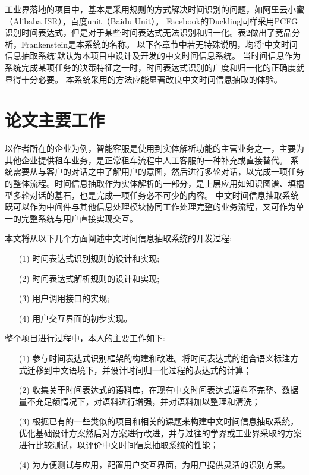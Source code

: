 工业界落地的项目中，基本是采用规则的方式解决时间识别的问题，如阿里云小蜜（Alibaba ISR），百度unit（Baidu Unit）。
Facebook的Duckling同样采用PCFG识别时间表达式，但是对于某些时间表达式无法识别和归一化。表2做出了竞品分析，Frankenstein是本系统的名称。
以下各章节中若无特殊说明，均将‘中文时间信息抽取系统’默认为本项目中设计及开发的中文时间信息系统。
当时间信息作为系统完成某项任务的决策特征之一时，时间表达式识别的广度和归一化的正确度就显得十分必要。
本系统采用的方法应能显著改良中文时间信息抽取的体验。


\section{论文主要工作}

以作者所在的企业为例，智能客服是使用到实体解析功能的主营业务之一，主要为其他企业提供租车业务，是正常租车流程中人工客服的一种补充或直接替代。
系统需要从与客户的对话之中了解用户的意图，然后进行多轮对话，以完成一项任务的整体流程。时间信息抽取作为实体解析的一部分，是上层应用如知识图谱、填槽型多轮对话的基石，也是完成一项任务必不可少的内容。
中文时间信息抽取系统既可以作为中间件与其他信息处理模块协同工作处理完整的业务流程，又可作为单一的完整系统与用户直接实现交互。

本文将从以下几个方面阐述中文时间信息抽取系统的开发过程:
\begin{enumerate}
    \item[(1)] 时间表达式识别规则的设计和实现;
    \item[(2)] 时间表达式解析规则的设计和实现;
    \item[(3)] 用户调用接口的实现;
    \item[(4)] 用户交互界面的初步实现。
\end{enumerate}

整个项目进行过程中，本人的主要工作如下:
\begin{enumerate}
    \item[(1)] 参与时间表达式识别框架的构建和改进。将时间表达式的组合语义标注方式迁移到中文语境下，并设计时间归一化过程的表达式的计算；
    \item[(2)] 收集关于时间表达式的语料库，在现有中文时间表达式语料不完整、数据量不充足额情况下，对语料进行增强，并对语料加以整理和清洗；
    \item[(3)] 根据已有的一些类似的项目和相关的课题来构建中文时间信息抽取系统，优化基础设计方案然后对方案进行改进，并与过往的学界或工业界采取的方案进行比较测试，以评价中文时间信息抽取系统的性能；
    \item[(4)] 为方便测试与应用，配置用户交互界面，为用户提供灵活的识别方案。
\end{enumerate}


